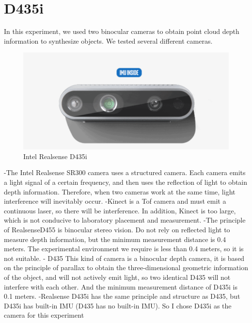 \section{D435i}
In this experiment, we used two binocular cameras to obtain point cloud depth information to synthesize objects. We tested several different cameras.
\begin{figure}[htp]
	\centering %
	\includegraphics[width = 15.3cm]{figures/camera}
	\caption{ Intel Realsense D435i}
	\label{fig:figure1label}
\end{figure}
-The Intel Realsense SR300 camera uses a structured camera. Each camera emits a light signal of a certain frequency, and then uses the reflection of light to obtain depth information. Therefore, when two cameras work at the same time, light interference will inevitably occur.
-Kinect is a Tof camera and must emit a continuous laser, so there will be interference. In addition, Kinect is too large, which is not conducive to laboratory placement and measurement.
-The principle of RealsenseD455 is binocular stereo vision. Do not rely on reflected light to measure depth information, but the minimum measurement distance is 0.4 meters. The experimental environment we require is less than 0.4 meters, so it is not suitable.
- D435 This kind of camera is a binocular depth camera, it is based on the principle of parallax to obtain the three-dimensional geometric information of the object, and will not actively emit light, so two identical D435 will not interfere with each other. And the minimum measurement distance of D435i is 0.1 meters.
-Realsense D435i has the same principle and structure as D435, but D435i has built-in IMU (D435 has no built-in IMU).
So I chose D435i as the camera for this experiment

